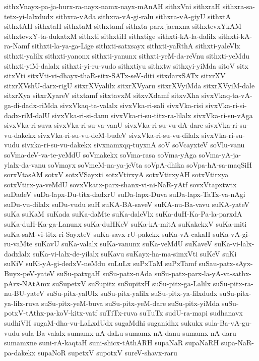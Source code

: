 {sithxVnayx-pa-ja-hurx-ra-nayx-namx-nayx-mAnAH
sithxVni
sithxraH
sithxra-sa-tetx-yi-lalxdudx
sithxra-vAda
sithxra-vA-gi-ralu
sithxra-vA-giyU
sithxtA
sithxtAH
sithxtaH
sithxtaM
sithxtamf
sithxta-parx-jacnxna
sithxtevxYkAM
sithxtevxY-ta-dukatxM
sithxti
sithxtiH
sithxtige
sithxti-kA-la-dalilx
sithxti-kA-ra-Namf
sithxti-la-ya-ga-Lige
sithxti-satxsayx
sithxti-yaRthA
sithxti-yaleVlx
sithxti-yalilx
sithxti-yanonx
sithxti-yanunx
sithxti-yeM-da-reVnu
sithxti-yeMdu
sithxti-yiM-dalalx
sithxti-yi-ru-vudo
sithxtiyu
sithxtw
sithxyi-yiMda
sitoV
sitx
sitxVti
sitxVti-vi-dhayx-thaR-sitx-SATx-seV-diti
sitxdarxSATx
sitxrXV
sitxrXVshU-darx-rigU
sitxrXVyalilx
sitxrXVyaru
sitxrXVyiMda
sitxrXVyiM-dale
sitxrXya
sitxrXyareV
sitxtamf
sitxtavxM
sitxvXdamf
sitxvXha
sivxVkaq-ta-vA-ga-di-dadx-riMda
sivxVkaq-ta-valalx
sivxVka-ri-sali
sivxVka-risi
sivxVka-ri-si-dadx-riM-dalU
sivxVka-ri-si-danu
sivxVka-ri-su-titx-ra-lilalx
sivxVka-ri-su-vAga
sivxVka-ri-suva
sivxVka-ri-su-va-vanU
sivxVka-ri-su-vu-dA-dare
sivxVka-ri-su-vu-dakekx
sivxVka-ri-su-vu-deM-budeV
sivxVka-ri-su-vu-dilalx
sivxVka-ri-su-vudu
sivxka-ri-su-vu-dakekx
sivxnamxqq-tuyxnA
soV
soVcayxteV
soVlu-vanu
soVma-deV-va-te-yeMdU
soVmakekx
soVma-rasa
soVma-yAga
soVma-yA-ja-ylalx-da-vanu
soVmayx
soVmeM-na-ya-jeVta
soVpA-dhika
soVpa-hA-sa-maqSiH
sorxVtasAM
sotxV
sotxVSayxti
sotxVtirxyA
sotxVtirxyAH
sotxVtirxya
sotxVtirx-ya-veMdU
sovxVkatx-parx-shanx-vi-ni-NaR-yAtf
sovxVtapxtwtx
suDadeV
suDa-lapx-Du-titx-dadxrU
suDa-lapx-Duva
suDa-lapx-TaTx-va-nAgi
suDu-vu-dilalx
suDu-vudu
suH
suKA-BA-saveV
suKA-nu-Ba-vavu
suKA-yateV
suKa
suKaM
suKada
suKa-daMte
suKa-daleVlx
suKa-duH-Ka-Pa-la-parxdA
suKa-duH-Ka-ga-Lanunx
suKa-duHKeV
suKa-kA-mitA
suKakekxV
suKa-miti
suKa-saM-vi-titx-ri-SayxteV
suKa-savx-rU-pakekx
suKa-vA-cakaH
suKa-vA-gi-ru-vaMte
suKavU
suKa-valalx
suKa-vanunx
suKa-veMdU
suKaveV
suKa-vi-lalx-dadxlalx
suKa-vi-lalx-de-yilalx
suKavu
suKayx-ha-ma-simxVti
suKeV
suKi
suKiV
suKi-yA-gi-dedxV-neMdu
suLuLx
suPxTaM
suPxTamf
suSau-patx-sAyx-Buyx-peV-yateV
suSu-patxgaH
suSu-patx-nAda
suSu-patx-parx-la-yA-va-sathx-pArx-NAtAmx
suSupetxV
suSupitx
suSupitxH
suSu-pitx-ga-Lalilx
suSu-pitx-ra-nu-BU-yateV
suSu-pitx-yalUlx
suSu-pitx-yalilx
suSu-pitx-ya-lilxdudx
suSu-pitx-ya-lilx-ruva
suSu-pitx-yeM-buva
suSu-pitx-yeM-dare
suSu-pitx-yiMda
suSu-potxV-tAthx-pa-koV-kitx-vatf
suTiTx-ruva
suTuTx
sudU-ra-mapi
sudhanavx
sudhiVH
sugaM-dha-vu-LaLxdUdx
sugaMdhi
suganidhx
sukukx
sula-Ba-vA-gu-vudu
sula-Ba-valalx
sumamx-nA-daLu
sumamx-nA-danu
sumamx-nA-daru
sumamxne
suni-rA-kaqtaH
suni-shicx-tAthARH
supaNaR
supaNaRH
supa-NaR-pa-dakekx
supaNoR
supetxV
supotxV
sureV-shavx-raru
}
